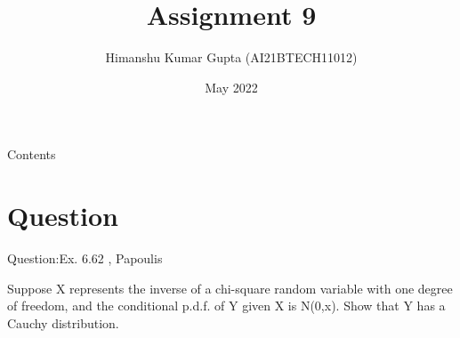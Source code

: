 \documentclass[journal,12pt,twocolumn]{beamer}
\title{Assignment 9}
\author{Himanshu Kumar Gupta (AI21BTECH11012)}
\date {May 2022}
\begin{document}
\begin{frame}
 \maketitle   
\end{frame}

\begin{frame}{Contents}
    \tableofcontents
\end{frame}

\section{Question}
\begin{frame}{Question:Ex. 6.62 , Papoulis}
\begin{block}

Suppose X represents the inverse of a chi-square random variable with one degree of freedom, 
and the conditional p.d.f. of Y given X is N(0,x). Show that Y has a Cauchy distribution.
\end{block}
\end{frame}
\end{document}

